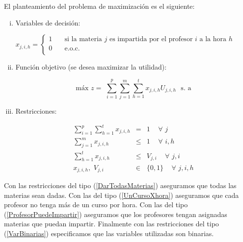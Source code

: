 El planteamiento del problema de maximización es el siguiente:

\begin{enumerate}[i)]
\item Variables de decisión:
  
  $ x_{j,i,h} =
  \begin{cases}
1  & \quad \text{si la materia } j \text{ es impartida por el profesor  } i \text{ a la hora } h\\
0  & \quad \text{e.o.c. } \\
\end{cases}
$
  
  \item Función objetivo (se desea maximizar la utilidad):

\begin{equation*}
\text{máx} \,\, z =  \,\, \displaystyle \sum_{i=1}^{p} \sum_{j=1}^{m} \sum_{h=1}^{t} x_{j,i,h} U_{j,i,h} \,\,\,\, \text{s. a}
\end{equation*}

\item Restricciones:
  
  \begin{eqnarray}
\displaystyle \sum_{i=1}^{p} \sum_{h=1}^{t} x_{j,i,h} &=& 1  \,\,\,\,\,\,\, \forall \,\, j\label{DarTodasMaterias}\\
\displaystyle \sum_{j=1}^{m} x_{j,i,h} &\leqslant& 1 \,\,\,\,\,\,\, \forall \,\, i,h \label{UnCursoXhora}\\
\displaystyle \sum_{h=1}^{t} x_{j,i,h} &\leqslant& V_{j,i} \,\,\,\,\,\,\, \forall \,\, j,i \label{ProfesorPuedeImpartir}\\
x_{j,i,h}, \,\, V_{j,i} &\in& \{0,1\} \,\,\,\,\,\,\, \forall \,\, j,i,h \label{VarBinarias}
\end{eqnarray}
\end{enumerate}

Con las restricciones del tipo (\ref{DarTodasMaterias}) aseguramos que todas las materias sean dadas. Con las del tipo (\ref{UnCursoXhora}) aseguramos que cada profesor no tenga más de un curso por hora. Con las del tipo (\ref{ProfesorPuedeImpartir}) aseguramos que los profesores tengan asignadas materias que puedan impartir. Finalmente con las restricciones del tipo (\ref{VarBinarias}) especificamos que las variables utilizadas son binarias.



